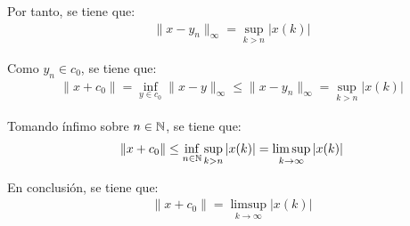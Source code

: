 \begin{ejercicio}
Por tanto, se tiene que:
\begin{align*}
    \|x - y_n\|_\infty = \sup\limits_{k > n} |x(k)|
\end{align*}

Como $y_n \in c_0$, se tiene que:
\begin{align*}
    \|x + c_0\| = \inf\limits_{y \in c_0} \|x - y\|_\infty \leq \|x - y_n\|_\infty = \sup\limits_{k > n} |x(k)|
\end{align*}

Tomando ínfimo sobre $n \in \mathbb{N}$, se tiene que:
\begin{align*}
    \|x + c_0\| \leq \inf\limits_{n \in \mathbb{N}} \sup\limits_{k > n} |x(k)|= \limsup\limits_{k \to \infty} |x(k)|
\end{align*}

En conclusión, se tiene que:
\begin{align*}
    \|x + c_0\| = \limsup\limits_{k \to \infty} |x(k)|
\end{align*}

\end{ejercicio}

